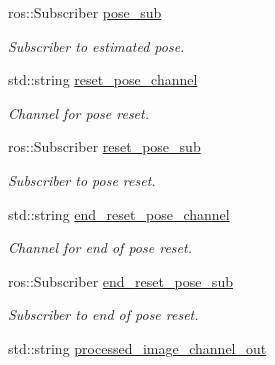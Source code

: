\begin{DoxyCompactItemize}
ros\+::\+Subscriber \hyperlink{classImageProcessor_acec03fa90dcfe504222c82ae2f3c30a4}{pose\+\_\+sub}
\begin{DoxyCompactList}\small\item\em Subscriber to estimated pose. \end{DoxyCompactList}\item 
\mbox{\label{classImageProcessor_a88ec7454f073462c8a7ca450e43dd539}} 
std\+::string \hyperlink{classImageProcessor_a88ec7454f073462c8a7ca450e43dd539}{reset\+\_\+pose\+\_\+channel}
\begin{DoxyCompactList}\small\item\em Channel for pose reset. \end{DoxyCompactList}\item 
\mbox{\label{classImageProcessor_a8596b9b6db94f1dc0d93f999444b5766}} 
ros\+::\+Subscriber \hyperlink{classImageProcessor_a8596b9b6db94f1dc0d93f999444b5766}{reset\+\_\+pose\+\_\+sub}
\begin{DoxyCompactList}\small\item\em Subscriber to pose reset. \end{DoxyCompactList}\item 
\mbox{\label{classImageProcessor_a600802b2e07fe85edae2e9a8b008aeb9}} 
std\+::string \hyperlink{classImageProcessor_a600802b2e07fe85edae2e9a8b008aeb9}{end\+\_\+reset\+\_\+pose\+\_\+channel}
\begin{DoxyCompactList}\small\item\em Channel for end of pose reset. \end{DoxyCompactList}\item 
\mbox{\label{classImageProcessor_af9b887dea99d4724a1656d4e0caa0cb4}} 
ros\+::\+Subscriber \hyperlink{classImageProcessor_af9b887dea99d4724a1656d4e0caa0cb4}{end\+\_\+reset\+\_\+pose\+\_\+sub}
\begin{DoxyCompactList}\small\item\em Subscriber to end of pose reset. \end{DoxyCompactList}\item 
\mbox{\label{classImageProcessor_a4cd1ce0e630478d0e706003f1b5d61d7}} 
std\+::string \hyperlink{classImageProcessor_a4cd1ce0e630478d0e706003f1b5d61d7}{processed\+\_\+image\+\_\+channel\+\_\+out}

\end{DoxyCompactItemize}

